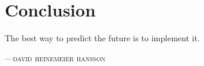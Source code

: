 %
%

\chapter{Conclusion}
\epigraph{The best way to predict the future is to implement it.}
{\textsc{---david heinemeier hansson}}

